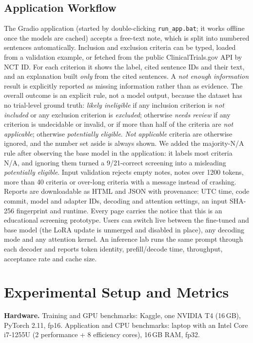 \documentclass[conference]{IEEEtran}
\newcommand{\code}[1]{\texttt{\small #1}}
\begin{document}
\subsection{Application Workflow}
The Gradio application (started by double-clicking \code{run\_app.bat}; it works offline once the models are cached) accepts a free-text note, which is split into numbered sentences automatically. Inclusion and exclusion criteria can be typed, loaded from a validation example, or fetched from the public ClinicalTrials.gov API by NCT ID. For each criterion it shows the label, cited sentence IDs and their text, and an explanation built \emph{only} from the cited sentences. A \emph{not enough information} result is explicitly reported as missing information rather than as evidence. The overall outcome is an explicit rule, not a model output, because the dataset has no trial-level ground truth: \emph{likely ineligible} if any inclusion criterion is \emph{not included} or any exclusion criterion is \emph{excluded}; otherwise \emph{needs review} if any criterion is undecidable or invalid, or if more than half of the criteria are \emph{not applicable}; otherwise \emph{potentially eligible}. \emph{Not applicable} criteria are otherwise ignored, and the number set aside is always shown. We added the majority-N/A rule after observing the base model in the application: it labels most criteria N/A, and ignoring them turned a 9/21-correct screening into a misleading \emph{potentially eligible}. Input validation rejects empty notes, notes over 1200 tokens, more than 40 criteria or over-long criteria with a message instead of crashing. Reports are downloadable as HTML and JSON with provenance: UTC time, code commit, model and adapter IDs, decoding and attention settings, an input SHA-256 fingerprint and runtime. Every page carries the notice that this is an educational screening prototype. Users can switch live between the fine-tuned and base model (the LoRA update is unmerged and disabled in place), any decoding mode and any attention kernel. An inference lab runs the same prompt through each decoder and reports token identity, prefill/decode time, throughput, acceptance rate and cache size.

\section{Experimental Setup and Metrics}
\textbf{Hardware.} Training and GPU benchmarks: Kaggle, one NVIDIA T4 (16\,GB), PyTorch 2.11, fp16. Application and CPU benchmarks: laptop with an Intel Core i7-1255U (2 performance + 8 efficiency cores), 16\,GB RAM, fp32.
\end{document}
